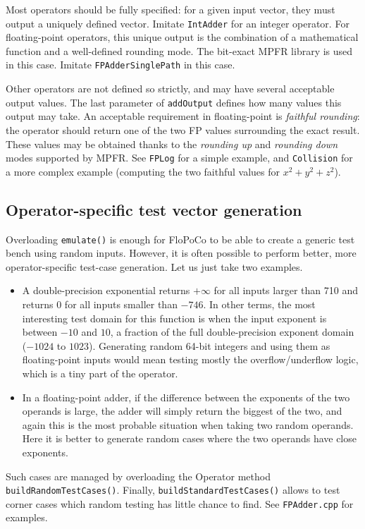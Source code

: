 \documentclass{article}
\begin{document}
 Most operators should be fully specified: for a given input
  vector, they must output a uniquely defined vector. Imitate
  \texttt{IntAdder} for an integer operator. For floating-point
  operators, this unique output is the combination of a mathematical
  function and a well-defined rounding mode. The bit-exact MPFR
  library is used in this case. Imitate \texttt{FPAdderSinglePath} in this case.

 Other operators are not defined so strictly, and may have
  several acceptable output values. The last parameter of \texttt{addOutput}
  defines how many values this output may take. An acceptable
  requirement in floating-point is \emph{faithful rounding}: the
  operator should return one of the two FP values surrounding the
  exact result. These values may be obtained thanks to the
  \emph{rounding up} and \emph{rounding down} modes supported by
  MPFR. See \texttt{FPLog} for a simple example, and
  \texttt{Collision} for a more complex example (computing the two
  faithful values for $x^2+y^2+z^2$).

\subsection{Operator-specific test  vector generation}
Overloading \texttt{\small emulate()} is enough for FloPoCo to be able
to create a generic test bench using random inputs. However, it is
often possible to perform better, more operator-specific test-case
generation. Let us just take two examples.

\begin{itemize}\item 
  A double-precision exponential returns $+\infty$ for all inputs
  larger than 710 and returns $0$ for all inputs smaller than
  $-746$. In other terms, the most interesting test domain for this
  function is when the input exponent is between $-10$ and $10$, a
  fraction of the full double-precision exponent domain ($-1024$ to
  $1023$). Generating random 64-bit integers and using them as
  floating-point inputs would mean testing mostly the
  overflow/underflow logic, which is a tiny part of the operator.


\item In a floating-point adder, if the difference between the exponents
  of the two operands is large, the adder will simply return the
  biggest of the two, and again this is the most probable situation
  when taking two random operands. Here it is better to generate
  random cases where the two operands have close exponents.
\end{itemize}
  Such cases are managed by overloading the Operator method
  \texttt{\small buildRandomTestCases()}. Finally,
  \texttt{\small buildStandardTestCases()} allows to test corner cases which
  random testing has little chance to find. See \texttt{FPAdder.cpp} for examples.
\end{document}
